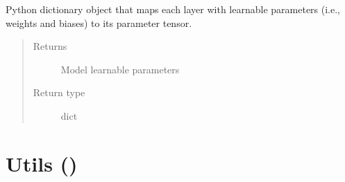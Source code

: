 \documentclass[letterpaper,10pt,english]{sphinxmanual}
\begin{document}
\begin{fulllineitems}

\begin{fulllineitems}
\label{\detokenize{code:gpt2_summarizer_inference.InferenceGPT2Summarizer.state_dict}}
\sphinxAtStartPar
Python dictionary object that maps each layer with learnable parameters (i.e., weights
and biases) to its parameter tensor.
\begin{quote}\begin{description}
\item[{Returns}] \leavevmode
\sphinxAtStartPar
Model learnable parameters

\item[{Return type}] \leavevmode
\sphinxAtStartPar
dict

\end{description}\end{quote}

\end{fulllineitems}


\end{fulllineitems}



\chapter{Utils ()}
\label{\detokenize{code:module-utils}}\label{\detokenize{code:utils-utils-py}}
\end{document}
